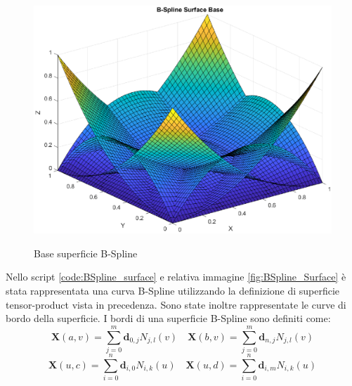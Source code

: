 \documentclass[a4paper, 12pt]{article}
\begin{document}

\begin{figure}[h!]
	\centering
	\caption{Base superficie B-Spline}
	\includegraphics[scale=0.7]{surface_base_plot.eps}
	\label{fig:BSplineBaseSurface}
\end{figure}
Nello script \ref{code:BSpline_surface} e relativa immagine \ref{fig:BSpline_Surface} è stata rappresentata una curva B-Spline utilizzando la definizione di superficie tensor-product vista in precedenza. Sono state inoltre rappresentate le curve di bordo della superficie. I bordi di una superficie B-Spline sono definiti come:
$$\mathbf{X}(a,v) = \sum_{j=0}^{m} \mathbf{d}_{0,j}N_{j, l}(v) \quad \mathbf{X}(b,v) = \sum_{j=0}^{m} \mathbf{d}_{n,j}N_{j,l}(v)$$
$$\mathbf{X}(u, c) = \sum_{i=0}^{n} \mathbf{d}_{i,0}N_{i,k}(u) \quad \mathbf{X}(u,d) = \sum_{i=0}^{n} \mathbf{d}_{i, m}N_{i,k}(u)$$ \newpage


\end{document}
